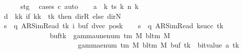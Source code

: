 \begin{isabellebody}
\ \ \ \ \isamarkupfalse%
\ stg\ \isamarkupfalse%
\ {\isacharparenleft}{\kern0pt}cases\ c{\isacharprime}{\kern0pt}{\isacharparenright}{\kern0pt}\ auto\isanewline
\ \ \isamarkupfalse%
\ {\isacharquery}{\kern0pt}a\ {\isacharequal}{\kern0pt}\ {\isachardoublequoteopen}{\isasymlambda}k{\isachardot}{\kern0pt}\ ts\ k\ {\isacharparenleft}{\kern0pt}n\ k{\isacharparenright}{\kern0pt}{\isachardoublequoteclose}\isanewline
\ \ \isamarkupfalse%
\ {\isacharquery}{\kern0pt}d\ {\isacharequal}{\kern0pt}\ {\isachardoublequoteopen}{\isasymlambda}kk{\isachardot}{\kern0pt}\ if\ kk\ {\isacharequal}{\kern0pt}\ tk\ then\ dir{\isachardot}{\kern0pt}R\ else\ dir{\isachardot}{\kern0pt}N{\isachardoublequoteclose}\isanewline
\ \ \isamarkupfalse%
\ {\isacharquery}{\kern0pt}s\ {\isacharequal}{\kern0pt}\ {\isachardoublequoteopen}{\isacharparenleft}{\kern0pt}q{\isacharcomma}{\kern0pt}\ AR{\isacharunderscore}{\kern0pt}SimRead{\isacharcomma}{\kern0pt}\ tk{\isacharcomma}{\kern0pt}\ i{\isacharcomma}{\kern0pt}\ buf{\isacharcomma}{\kern0pt}\ dvec{\isacharcomma}{\kern0pt}\ posk{\isacharparenright}{\kern0pt}{\isachardoublequoteclose}\isanewline
\ \ \isamarkupfalse%
\ {\isacharquery}{\kern0pt}s{\isacharprime}{\kern0pt}\ {\isacharequal}{\kern0pt}\ {\isachardoublequoteopen}{\isacharparenleft}{\kern0pt}q{\isacharcomma}{\kern0pt}\ AR{\isacharunderscore}{\kern0pt}SimRead{\isacharcomma}{\kern0pt}\ k{\isacharunderscore}{\kern0pt}succ\ tk{\isacharcomma}{\kern0pt}\ {}{\isacharcomma}{\kern0pt}\isanewline
\ \ \ \ \ \ \ \ \ \ \ \ \ \ buf{\isacharparenleft}{\kern0pt}tk\ {\isacharcolon}{\kern0pt}{\isacharequal}{\kern0pt}\ gamma{\isacharunderscore}{\kern0pt}unenum\ {\isacharparenleft}{\kern0pt}{\isasymGamma}{\isacharunderscore}{\kern0pt}tm\ M{\isacharparenright}{\kern0pt}\ {\isacharparenleft}{\kern0pt}bl{\isacharunderscore}{\kern0pt}tm\ M{\isacharparenright}{\kern0pt}\isanewline
\ \ \ \ \ \ \ \ \ \ \ \ \ \ \ \ \ \ \ \ {\isacharparenleft}{\kern0pt}{}\ {\isacharasterisk}{\kern0pt}\ gamma{\isacharunderscore}{\kern0pt}enum\ {\isacharparenleft}{\kern0pt}{\isasymGamma}{\isacharunderscore}{\kern0pt}tm\ M{\isacharparenright}{\kern0pt}\ {\isacharparenleft}{\kern0pt}bl{\isacharunderscore}{\kern0pt}tm\ M{\isacharparenright}{\kern0pt}\ {\isacharparenleft}{\kern0pt}buf\ tk{\isacharparenright}{\kern0pt}\ {\isacharplus}{\kern0pt}\ bit{\isacharunderscore}{\kern0pt}value\ {\isacharparenleft}{\kern0pt}{\isacharquery}{\kern0pt}a\ tk{\isacharparenright}{\kern0pt}{\isacharparenright}{\kern0pt}{\isacharparenright}{\kern0pt}{\isacharcomma}{\kern0pt}\isanewline

\end{isabellebody}
